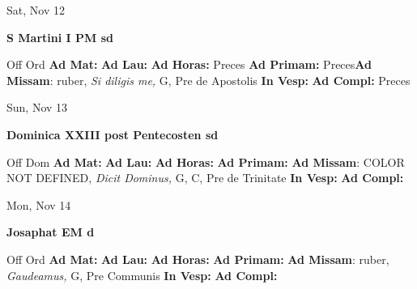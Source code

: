\documentclass[10pt]{memoir}
\begin{document}
\begin{center}
\begin{minipage}{3.5in}
\vspace{2em}
\begin{center}Sat, Nov 12
\end{center}
\textbf{ \large S Martini I PM
\textnormal{\normalsize sd}}

\begin{justify}Off Ord
\textbf{Ad Mat: }
\textbf{Ad Lau: }
\textbf{Ad Horas: }Preces
\textbf{Ad Primam: }Preces\textbf{Ad Missam}: ruber, \textit{Si diligis me,} G, Pre de Apostolis
\textbf{In Vesp: }
\textbf{Ad Compl: }Preces
\end{justify}
\end{minipage}
\end{center}

\begin{center}
\begin{minipage}{3.5in}
\vspace{2em}
\begin{center}Sun, Nov 13
\end{center}
\textbf{ \large Dominica XXIII post Pentecosten
\textnormal{\normalsize sd}}

\begin{justify}Off Dom
\textbf{Ad Mat: }
\textbf{Ad Lau: }
\textbf{Ad Horas: }
\textbf{Ad Primam: }\textbf{Ad Missam}: COLOR NOT DEFINED, \textit{Dicit Dominus,} G, C, Pre de Trinitate
\textbf{In Vesp: }
\textbf{Ad Compl: }
\end{justify}
\end{minipage}
\end{center}

\begin{center}
\begin{minipage}{3.5in}
\vspace{2em}
\begin{center}Mon, Nov 14
\end{center}
\textbf{ \large Josaphat EM
\textnormal{\normalsize d}}

\begin{justify}Off Ord
\textbf{Ad Mat: }
\textbf{Ad Lau: }
\textbf{Ad Horas: }
\textbf{Ad Primam: }\textbf{Ad Missam}: ruber, \textit{Gaudeamus,} G, Pre Communis
\textbf{In Vesp: }
\textbf{Ad Compl: }
\end{justify}
\end{minipage}
\end{center}
\end{document}
